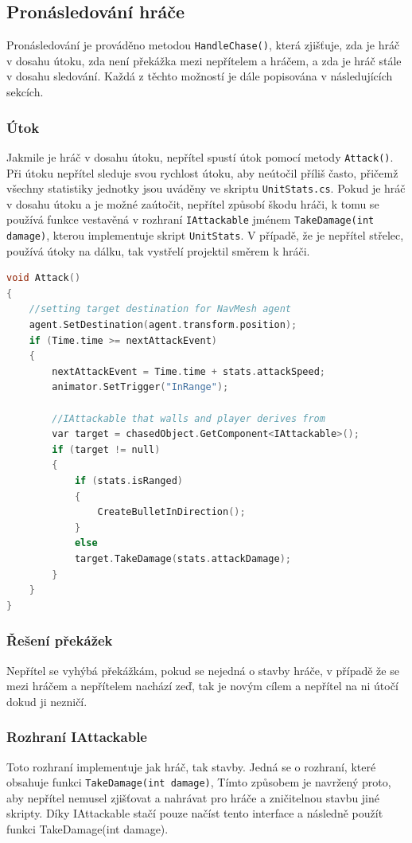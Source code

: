 \subsection{Pronásledování hráče}
Pronásledování je prováděno metodou \texttt{HandleChase()}, která zjišťuje, zda je hráč v dosahu útoku, zda není překážka mezi nepřítelem a hráčem, a zda je hráč stále v dosahu sledování. Každá z těchto možností je dále popisována v následujících sekcích.

\subsubsection{Útok}
Jakmile je hráč v dosahu útoku, nepřítel spustí útok pomocí metody \texttt{Attack()}. Při útoku nepřítel sleduje svou rychlost útoku, aby neútočil příliš často, přičemž všechny statistiky jednotky jsou uváděny ve skriptu \texttt{UnitStats.cs}. Pokud je hráč v dosahu útoku a je možné zaútočit, nepřítel způsobí škodu hráči, k tomu se používá funkce vestavěná v rozhraní \texttt{IAttackable} jménem \texttt{TakeDamage(int damage)}, kterou implementuje skript \texttt{UnitStats}. V případě, že je nepřítel střelec, používá útoky na dálku, tak vystřelí projektil směrem k hráči.

\begin{lstlisting}[language=C]
void Attack()
{
	//setting target destination for NavMesh agent
	agent.SetDestination(agent.transform.position);
	if (Time.time >= nextAttackEvent)
	{
		nextAttackEvent = Time.time + stats.attackSpeed;
		animator.SetTrigger("InRange");
		
		//IAttackable that walls and player derives from
		var target = chasedObject.GetComponent<IAttackable>();
		if (target != null)
		{
			if (stats.isRanged)
			{
				CreateBulletInDirection();
			}
			else
			target.TakeDamage(stats.attackDamage);
		}
	}
}
\end{lstlisting}

\subsubsection{Řešení překážek}
Nepřítel se vyhýbá překážkám, pokud se nejedná o stavby hráče, v případě že se mezi hráčem a nepřítelem nachází zeď, tak je novým cílem a nepřítel na ni útočí dokud ji nezničí.

\subsubsection{Rozhraní IAttackable}
Toto rozhraní implementuje jak hráč, tak stavby. Jedná se o rozhraní, které obsahuje funkci \texttt{TakeDamage(int damage)}, Tímto způsobem je navržený proto, aby nepřítel nemusel zjišťovat a nahrávat pro hráče a zničitelnou stavbu jiné skripty. Díky IAttackable stačí pouze načíst tento interface a následně použít funkci TakeDamage(int damage).

